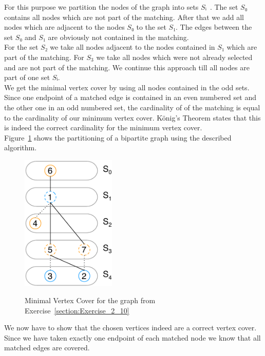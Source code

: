 \documentclass[a4paper, 12pt]{report}
\begin{document}
For this purpose we partition the nodes of the graph into sets
$Sᵢ$~\cite{Wikipedia_Koenigs_Theorem}. The set $S₀$ contains all nodes which
are not part of the matching. After that we add all nodes which are adjacent to
the nodes $S₀$ to the set $S₁$. The edges between the set $S₀$ and $S₁$ are
obviously not contained in the matching.\\

For the set $S₂$ we take all nodes adjacent to the nodes contained in $S₁$
which are part of the matching. For $S_3$ we take all nodes which were not
already selected and are not part of the matching. We continue this approach
till all nodes are part of one set $Sᵢ$.\\

We get the minimal vertex cover by using all nodes contained in the odd sets.
Since one endpoint of a matched edge is contained in an even numbered set and
the other one in an odd numbered set, the cardinality of of the matching is
equal to the cardinality of our minimum vertex cover. König’s Theorem states
that this is indeed the correct cardinality for the minimum vertex cover.\\

Figure~\ref{figure:Exercise_2_11} shows the partitioning of a bipartite graph
using the described algorithm.\\

\begin{figure}[htbp]
    \caption{Minimal Vertex Cover for the graph from
             Exercise~\ref{section:Exercise_2_10}}
    \vskip 0.2cm
    \centering
    \includegraphics[width=0.4\textwidth]{Figures/Exercise_2_11}
    \label{figure:Exercise_2_11}
\end{figure}

We now have to show that the chosen vertices indeed are a correct vertex cover.
Since we have taken exactly one endpoint of each matched node we know that all
matched edges are covered.\\
\end{document}
